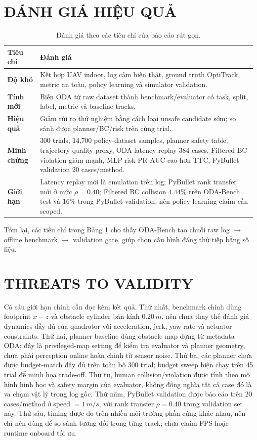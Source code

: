 \documentclass[10pt,letterpaper,twocolumn]{article}
\begin{document}
\section{ĐÁNH GIÁ HIỆU QUẢ}
\begin{table}[H]
\centering
\footnotesize
\caption{Đánh giá theo các tiêu chí của báo cáo rút gọn.}
\label{tab:effectiveness}
\begin{tabularx}{\columnwidth}{>{\bfseries}p{2.2cm} X}
\toprule
Tiêu chí & Đánh giá \\
\midrule
Độ khó & Kết hợp UAV indoor, log cảm biến thật, ground truth OptiTrack, metric an toàn, policy learning và simulator validation. \\
Tính mới & Biến ODA từ raw dataset thành benchmark/evaluator có task, split, label, metric và baseline tracks. \\
Hiệu quả & Giảm rủi ro thử nghiệm bằng cách loại unsafe candidate sớm; so sánh được planner/BC/risk trên cùng trial. \\
Minh chứng & 300 trials, 14,700 policy-dataset samples, planner safety table, trajectory-quality proxy, ODA latency replay 384 cases, Filtered BC violation giảm mạnh, MLP risk PR-AUC cao hơn TTC, PyBullet validation 20 cases/method. \\
Giới hạn & Latency replay mới là emulation trên log; PyBullet rank transfer mới ở mức \(\rho=0.40\); Filtered BC collision \(4.44\%\) trên ODA-Bench test và \(16\%\) trong PyBullet validation, nên policy-learning claim cần scoped. \\
\bottomrule
\end{tabularx}
\end{table}

Tóm lại, các tiêu chí trong Bảng \ref{tab:effectiveness} cho thấy ODA-Bench tạo chuỗi raw log \(\rightarrow\) offline benchmark \(\rightarrow\) validation gate, giúp chọn cấu hình đáng thử tiếp bằng số liệu.

\section{THREATS TO VALIDITY}
Có sáu giới hạn chính cần đọc kèm kết quả. Thứ nhất, benchmark chính dùng footprint \(x-z\) và obstacle cylinder bán kính \(0.20\,m\), nên chưa thay thế đánh giá dynamics đầy đủ của quadrotor với acceleration, jerk, yaw-rate và actuator constraints. Thứ hai, planner baseline dùng obstacle map dựng từ metadata ODA; đây là privileged-map setting để kiểm tra evaluator và planner geometry, chưa phải perception online hoàn chỉnh từ sensor noise. Thứ ba, các planner chưa được budget-match đầy đủ trên toàn bộ 300 trial; budget sweep hiện chạy trên 45 trial để minh họa trade-off. Thứ tư, human collision/violation được tính theo mô hình hình học và safety margin của evaluator, không đồng nghĩa tất cả case đó là va chạm vật lý trong log gốc. Thứ năm, PyBullet validation được báo cáo trên 20 cases/method ở speed \(=1\,m/s\), với rank transfer \(\rho=0.40\) trong validation set này. Thứ sáu, timing được đo trên nhiều môi trường phần cứng khác nhau, nên chỉ nên dùng để so sánh tương đối trong từng track; chưa claim FPS hoặc runtime onboard tối ưu.
\end{document}
